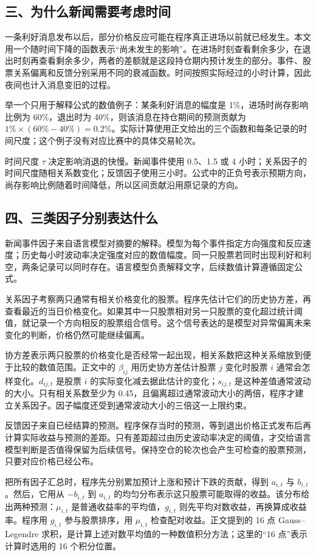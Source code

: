 \documentclass[conference]{IEEEtran}
\begin{document}
\subsection*{三、为什么新闻需要考虑时间}
一条利好消息发布以后，部分价格反应可能在程序真正进场以前就已经发生。本文用一个随时间下降的函数表示“尚未发生的影响”。在进场时刻查看剩余多少，在退出时刻再查看剩余多少，两者的差额就是这段持仓期内预计发生的部分。事件、股票关系偏离和反馈分别采用不同的衰减函数。时间按照实际经过的小时计算，因此夜间也计入消息变旧的过程。

举一个只用于解释公式的数值例子：某条利好消息的幅度是 1\%，进场时尚存影响比例为 60\%，退出时为 40\%，则该消息在持仓期间的预测贡献为 $1\%\times(60\%-40\%)=0.2\%$。实际计算使用正文给出的三个函数和每条记录的时间尺度；这个例子没有对应比赛中的具体交易轮次。

时间尺度 $\tau$ 决定影响消退的快慢。新闻事件使用 0.5、1.5 或 4 小时；关系因子的时间尺度随相关系数变化；反馈因子使用三小时。公式中的正负号表示预期方向，尚存影响比例随着时间降低，所以区间贡献沿用原记录的方向。

\subsection*{四、三类因子分别表达什么}
新闻事件因子来自语言模型对摘要的解释。模型为每个事件指定方向强度和反应速度；历史每小时波动率决定强度对应的数值幅度。同一只股票若同时出现利好和利空，两条记录可以同时存在。语言模型负责解释文字，后续数值计算遵循固定公式。

关系因子考察两只通常有相关价格变化的股票。程序先估计它们的历史协方差，再查看最近的当日价格变化。如果其中一只股票相对另一只股票的变化超过统计阈值，就记录一个方向相反的股票组合信号。这个信号表达的是模型对异常偏离未来变化的判断，价格仍然可能继续偏离。

协方差表示两只股票的价格变化是否经常一起出现，相关系数把这种关系缩放到便于比较的数值范围。正文中的 $\beta_{ij}$ 用历史协方差估计股票 $j$ 变化时股票 $i$ 通常会怎样变化。$d_{ij,t}$ 是股票 $i$ 的实际变化减去据此估计的变化；$s_{ij,t}$ 是这种差值通常波动的大小。只有相关系数至少为 0.45，且偏离超过通常波动大小的两倍，程序才建立关系因子。因子幅度还受到通常波动大小的三倍这一上限约束。

反馈因子来自已经结算的预测。程序保存当时的预测，等到退出价格正式发布后再计算实际收益与预测的差距。只有差距超过由历史波动率决定的阈值，才交给语言模型判断是否值得保留为后续信号。保持空仓的轮次也会产生可检查的股票预测，只要对应价格已经公布。

把所有因子汇总时，程序先分别累加预计上涨和预计下跌的贡献，得到 $a_{i,t}$ 与 $b_{i,t}$。然后，它用从 $-b_{i,t}$ 到 $a_{i,t}$ 的均匀分布表示这只股票可能取得的收益。该分布给出两种预测：$\mu_{i,t}$ 是普通收益率的平均值，$g_{i,t}$ 则先平均对数收益，再换算成收益率。程序用 $g_{i,t}$ 参与股票排序，用 $\mu_{i,t}$ 检查配对收益。正文提到的 16 点 Gauss--Legendre 求积，是计算上述对数平均值的一种数值积分方法；这里的“16 点”表示计算时选用的 16 个积分位置。
\end{document}
